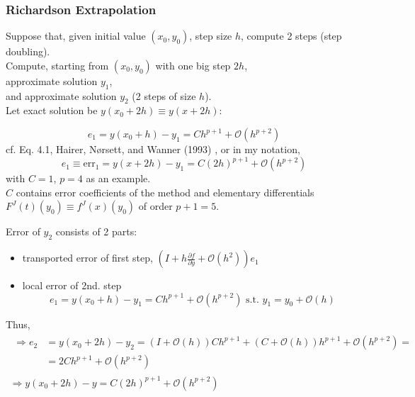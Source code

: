 \documentclass[10pt]{amsart}
\begin{document}
\begin{multicols*}{2}
\subsubsection{Richardson Extrapolation}

Suppose that, given initial value $(x_0, y_0)$, step size $h$, compute 2 steps (step doubling). \\

Compute, starting from $(x_0, y_0)$ with one big step $2h$, \\
approximate solution $y_1$, \\
and approximate solution $y_2$ (2 steps of size $h$). \\

Let exact solution be $y(x_0 + 2h) \equiv y(x + 2h)$:

\begin{equation}
	e_1 = y(x_0 + h) - y_1 = Ch^{p+1} + \mathcal{O}(h^{p + 2})
\end{equation}
cf. Eq. 4.1, Hairer, N\o rsett, and Wanner (1993) \cite{HNW1993}, or in my notation,
\begin{equation}
	e_1 \equiv \text{err}_1 = y(x+2h) - y_1 = C(2h)^{p+1} + \mathcal{O}(h^{p+2})
\end{equation}
with $C = 1$, $p=4$ as an example. \\

$C$ contains error coefficients of the method and elementary differentials $F^J(t)(y_0) \equiv f^J(x)(y_0)$ of order $p+1 =5$.

Error of $y_2$ consists of 2 parts: 
\begin{itemize}
	\item transported error of first step, $(I + h \frac{\partial f}{\partial y} + \mathcal{O}(h^2)) e_1$ 
	\item local error of 2nd. step
	\[
	e_1 = y(x_0 + h) - y_1 = Ch^{p+1} + \mathcal{O}(h^{p+2}) \text{ s.t. } y_1 = y_0 + \mathcal{O}(h)
	\]
\end{itemize}
Thus,
\[
\begin{gathered}
	\begin{aligned}
		\Longrightarrow e_2 & = y(x_0 + 2h) - y_2 = (I + \mathcal{O}(h)) Ch^{p+1} + (C +\mathcal{O}(h))h^{p+1} + \mathcal{O}(h^{p+2}) = \\
		& = 2Ch^{p+1} + \mathcal{O}(h^{p+2})
	\end{aligned} \\
\Longrightarrow y(x_0 + 2h) - y = C(2h)^{p+1} + \mathcal{O}(h^{p+2})
\end{gathered}
\]


\end{multicols*}
\end{document}
